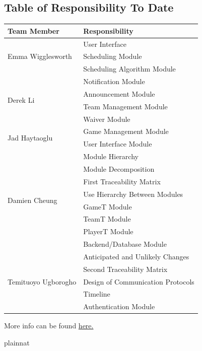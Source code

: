 \documentclass[12pt, titlepage]{article}
\begin{document}
\subsection*{Table of Responsibility To Date}

\begin{center}
	\begin{tabular}{| p{} | p{} |}
		\hline
		Team Member & Responsibility \\ 
		\toprule

		\multirow{3}{0.3\textwidth}{Emma Wigglesworth}
		& User Interface \\
		& Scheduling Module \\
		& Scheduling Algorithm Module \\

		\midrule

		\multirow{4}{0.3\textwidth}{Derek Li}
		& Notification Module \\
		& Announcement Module \\
		& Team Management Module \\
		& Waiver Module \\

		\midrule

		\multirow{2}{0.3\textwidth}{Jad Haytaoglu}
		& Game Management Module \\
		& User Interface Module \\

		\midrule

		\multirow{8}{0.3\textwidth}{Damien Cheung}
		& Module Hierarchy \\
		& Module Decomposition \\
		& First Traceability Matrix \\
		& Use Hierarchy Between Modules \\
		& GameT Module \\
		& TeamT Module \\
		& PlayerT Module \\
		& Backend/Database Module \\

		\midrule

		\multirow{5}{0.3\textwidth}{Temituoyo Ugborogho}
		& Anticipated and Unlikely Changes \\
		& Second Traceability Matrix \\
		& Design of Communication Protocols \\
		& Timeline \\
		& Authentication Module \\

		\bottomrule

	\end{tabular}
\end{center}

More info can be found \href{https://github.com/dcheung11/team-6-capstone-project}{here.}



 {plainnat}


\newpage{}
\end{document}
